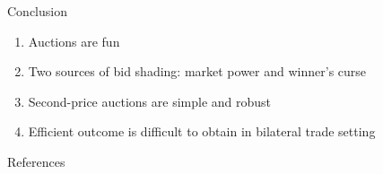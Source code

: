 \documentclass[english,10pt
,aspectratio=169
]{beamer}
\begin{document}
\begin{frame}{Conclusion}
	\begin{enumerate}
		\item Auctions are fun
		\item Two sources of bid shading: market power and winner's curse
		\item Second-price auctions are simple and robust
		\item Efficient outcome is difficult to obtain in bilateral trade setting
	\end{enumerate}
\end{frame}



\appendix
\begin{frame}[allowframebreaks]{References}
	
	
\end{frame}
\end{document}
